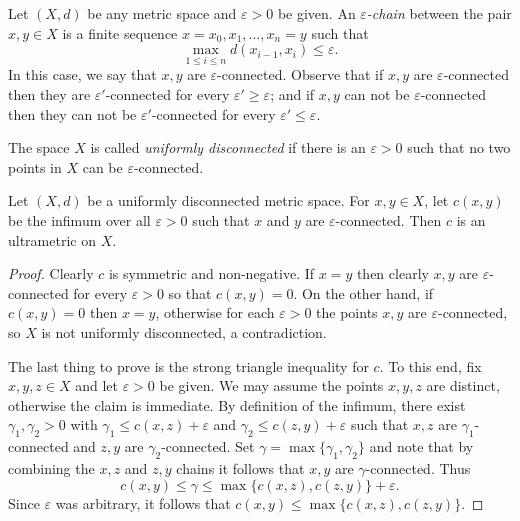 Let \( (X,d) \) be any metric space and \( \varepsilon > 0 \) be given. An \emph{\( \varepsilon  \)-chain} between the pair \( x,y \in X \) is a finite sequence \( x = x_0 , x_1, \hdots , x_{n} = y  \) such that \[\max_{1 \leq i \leq n}  d(x_{i-1} , x_{i}) \leq \varepsilon. \] In this case, we say that \( x, y \) are \( \varepsilon  \)-connected. Observe that if \( x, y \) are \( \varepsilon  \)-connected then they are \( \varepsilon ' \)-connected for every \( \varepsilon ' \geq \varepsilon  \); and if \( x, y \) can not be \( \varepsilon  \)-connected then they can not be \( \varepsilon ' \)-connected for every \( \varepsilon ' \leq \varepsilon  \).


The space \( X \) is called \emph{uniformly disconnected} if there is an \( \varepsilon > 0 \) such that no two points in \( X \) can be \( \varepsilon  \)-connected.
\begin{example}
Let \( (X,d) \) be a uniformly disconnected metric space. For \( x,y \in X \), let \( c(x,y) \) be the infimum over all \( \varepsilon > 0 \) such that \( x \) and \( y \) are \( \varepsilon  \)-connected. Then \( c \) is an ultrametric on \( X \).
\end{example}
\begin{proof}
Clearly \( c \) is symmetric and non-negative. If \( x = y \) then clearly \( x,y \) are \( \varepsilon  \)-connected for every \( \varepsilon > 0 \) so that \( c(x,y) = 0 \). On the other hand, if \( c(x,y) = 0  \) then \( x = y \), otherwise for each \( \varepsilon > 0 \) the points \( x,y \) are \( \varepsilon  \)-connected, so \( X \) is not uniformly disconnected, a contradiction.

The last thing to prove is the strong triangle inequality for \( c \). To this end, fix \( x,y,z \in X \) and let \( \varepsilon > 0 \) be given. We may assume the points \( x,y,z \) are distinct, otherwise the claim is immediate. By definition of the infimum, there exist \( \gamma_1, \gamma_2 > 0 \) with \( \gamma_1 \leq c(x,z) + \varepsilon  \) and \( \gamma_2 \leq c(z,y) + \varepsilon  \) such that \( x,z \) are \( \gamma_1 \)-connected and \( z,y \) are \( \gamma_2 \)-connected. Set \( \gamma = \max \{ \gamma_1, \gamma_2 \}\) and note that by combining the \( x,z \) and \( z,y \) chains it follows that \( x,y \) are \( \gamma \)-connected. Thus \[ c(x,y) \leq \gamma \leq \max \{ c(x,z), c(z,y) \} + \varepsilon . \] Since \( \varepsilon  \) was arbitrary, it follows that \( c(x,y) \leq \max \{ c(x,z), c(z,y) \} \).
\end{proof}
